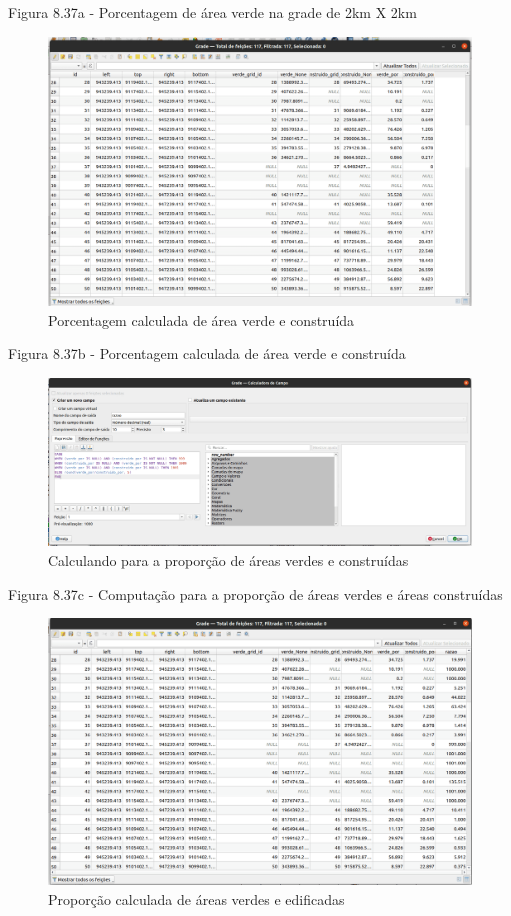 \documentclass[
]{krantz}
\begin{document}
Figura 8.37a - Porcentagem de área verde na grade de 2km X 2km

\begin{figure}
\centering
\includegraphics{media/modulo8/fig837_b.png}
\caption{Porcentagem calculada de área verde e construída}
\end{figure}

Figura 8.37b - Porcentagem calculada de área verde e construída

\begin{figure}
\centering
\includegraphics{media/modulo8/fig837_c.png}
\caption{Calculando para a proporção de áreas verdes e construídas}
\end{figure}

Figura 8.37c - Computação para a proporção de áreas verdes e áreas construídas

\begin{figure}
\centering
\includegraphics{media/modulo8/fig837_d.png}
\caption{Proporção calculada de áreas verdes e edificadas}
\end{figure}
\end{document}
